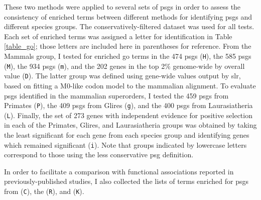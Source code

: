 These two methods were applied to several sets of \acp{psg} in order
to assess the consistency of enriched terms between different methods
for identifying \acp{psg} and different species groups. The
conservatively-filtered dataset was used for all tests. Each set of
enriched terms was assigned a letter for identification in Table
\ref{table_go}; those letters are included here in parentheses for
reference. From the Mammals group, I tested for enriched \ac{go} terms
in the 474 \psghoch \acp{psg} (\texttt{H}), the 585 \psgeone \acp{psg}
(\texttt{M}), the 934 \psgefive \acp{psg} (\texttt{m}), and the 202
genes in the top 2\% genome-wide by overall \dnds value
(\texttt{D}). The latter group was defined using gene-wide \dnds
values output by \ac{slr}, based on fitting a M0-like codon model to
the mammalian alignment. To evaluate \acp{psg} identified in the
mammalian superorders, I tested the 459 \psgeone \acp{psg} from
Primates (\texttt{P}), the 409 \psgefive \acp{psg} from Glires
(\texttt{g}), and the 400 \psgeone \acp{psg} from Laurasiatheria
(\texttt{L}). Finally, the set of 273 genes with independent evidence
for positive selection in each of the Primates, Glires, and
Laurasiatheria groups was obtained by taking the least significant
\psgefive \pv for each gene from each species group and
identifying genes which remained significant (\texttt{i}). Note that
groups indicated by lowercase letters correspond to those using the
less conservative \psgefive \ac{psg} definition.

In order to facilitate a comparison with functional associations
reported in previously-published studies, I also collected the lists
of terms enriched for \acp{psg} from \citet{Clark2003} (\texttt{C}),
the \citet{Macaque2007} (\texttt{R}), and \citet{Kosiol2008}
(\texttt{K}).

